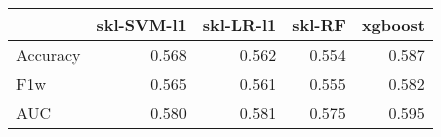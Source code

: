 \begin{tabular}{lrrrr}
\toprule
{} &  skl-SVM-l1 &  skl-LR-l1 &  skl-RF &  xgboost \\
\midrule
Accuracy &       0.568 &      0.562 &   0.554 &    0.587 \\
F1w      &       0.565 &      0.561 &   0.555 &    0.582 \\
AUC      &       0.580 &      0.581 &   0.575 &    0.595 \\
\bottomrule
\end{tabular}
